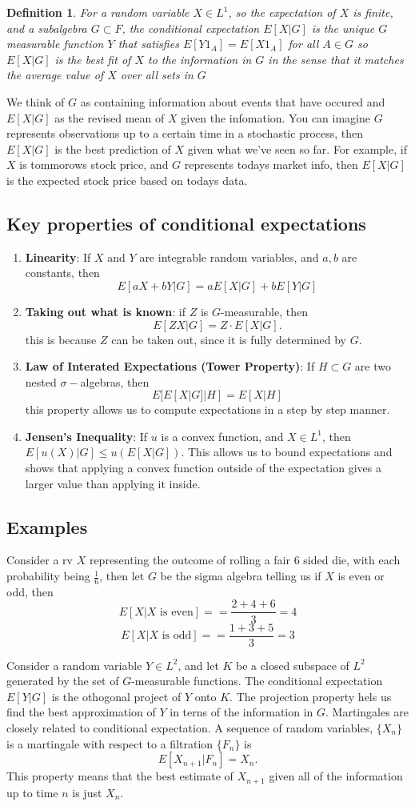 \documentclass{article}
\newtheorem{definition}{Definition}
\begin{document}
\begin{definition}
    For a random variable $X\in L^1$, so the expectation of $X$ is finite, and a subalgebra $G\subset F$, the conditional expectation $E[X|G]$ is 
    the unique $G$ measurable function $Y$ that satisfies $E[Y 1_A]= E[ X 1_A]$ for all $A \in G$
    so $E[X|G]$ is the best fit of $X$ to the information in $G$ in the sense that it matches the average value of $X$ over all sets in $G$ 
\end{definition}
We think of $G$ as containing information about events that have occured and $E[X|G]$ as the revised mean of $X$ given the infomation. You can imagine $G$ represents observations up to a certain time in a stochastic process, then $E[X|G]$ is the best prediction of $X$ given what we've seen so far. 
For example, if $X$ is tommorows stock price, and $G$ represents todays market info, then $E[X|G]$ is the expected stock price based on todays data.
\subsection{Key properties of conditional expectations}
\begin{enumerate}
    \item \textbf{Linearity}: If $X$ and $Y$ are integrable random variables, and $a,b$ are constants, then $$E[aX+bY|G] = aE[X|G]+bE[Y|G]$$
    \item \textbf{Taking out what is known}: if $Z$ is $G$-measurable, then $$E[ZX|G]= Z \cdot E[X|G].$$ this is because $Z$ can be taken out, since it is fully determined by $G$. 
    \item \textbf{Law of Interated Expectations (Tower Property)}: If $H\subset G$ are two nested $\sigma-$algebras, then $$E[E[X|G]|H]=E[X|H]$$ this property allows us to compute expectations in a step by step manner.
    \item \textbf{Jensen's Inequality}: If $u$ is a convex function, and $X\in L^1$, then $E[u(X)|G]\le u(E[X|G])$. This allows us to bound expectations and shows that applying a convex function outside of the expectation gives a larger value than applying it inside. 
\end{enumerate}
\subsection{Examples}
Consider a rv $X$ representing the outcome of rolling a fair 6 sided die, with each probability being $\frac{1}{6}$, then let $G$ be the sigma algebra telling us if $X$ is even or odd, then 
$$E[X| X \text{ is even}]= =\frac{2+4+6}{3}=4$$
$$E[X| X \text{ is odd}]= =\frac{1+3+5}{3}=3$$
\par Consider a random variable $Y\in L^2$, and let $K$ be a closed subspace of $L^2$ generated by the set of $G$-measurable functions. The conditional expectation $E[Y|G]$ is the othogonal project of $Y$ onto $K$. The projection property hels us find the best approximation of $Y$ in terns of the information in $G$.
Martingales are closely related to conditional expectation. A sequence of random variables, $\{X_n\}$ is a martingale with respect to a filtration $\{F_n\}$ is $$E[X_{n+1}|F_n]=X_n.$$
This property means that the best estimate of $X_{n+1}$ given all of the information up to time $n$ is just $X_n$.
\end{document}
